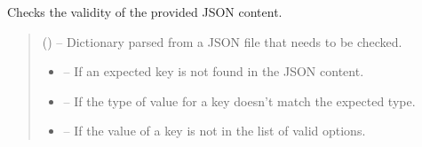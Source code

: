 \documentclass[letterpaper,10pt,english]{sphinxmanual}
\begin{document}
\begin{fulllineitems}
\label{\detokenize{fspsim.utils:fspsim.utils.SpaceCatalogue.check_json_file}}
\pysigstartsignatures
{}
\pysigstopsignatures
\sphinxAtStartPar
Checks the validity of the provided JSON content.
\begin{quote}\begin{description}
\sphinxAtStartPar
{} () – Dictionary parsed from a JSON file that needs to be checked.

\begin{itemize}
\item {} 
\sphinxAtStartPar
{} – If an expected key is not found in the JSON content.

\item {} 
\sphinxAtStartPar
{} – If the type of value for a key doesn’t match the expected type.

\item {} 
\sphinxAtStartPar
{} – If the value of a key is not in the list of valid options.

\end{itemize}

\end{description}\end{quote}

\end{fulllineitems}

\end{document}
